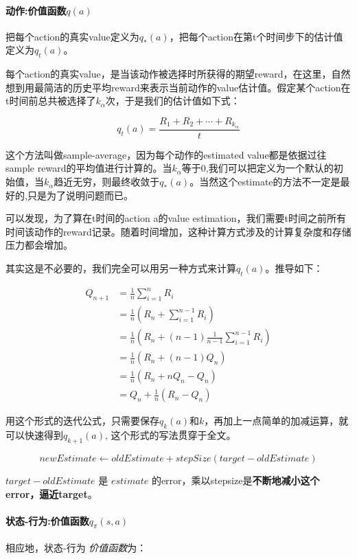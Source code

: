 \documentclass[UTF8,a4paper,12pt]{ctexbook}
\begin{document}
			\paragraph{动作:价值函数$q(a)$}
				把每个action的真实value定义为$q_*(a)$，把每个action在第t个时间步下的估计值定义为$q_t(a)$。
				
				每个action的真实value，是当该动作被选择时所获得的期望reward，在这里，自然想到用最简洁的历史平均reward来表示当前动作的value估计值。假定某个action在t时间前总共被选择了$k_\alpha$次，于是我们的估计值如下式：
			
				$$q_t(a) = \dfrac{R_1 + R_2 + \cdots + R_{k_\alpha}}{t}$$
				
				这个方法叫做sample-average，因为每个动作的estimated value都是依据过往sample reward的平均值进行计算的。当$k_\alpha$等于0,我们可以把定义为一个默认的初始值，当$k_\alpha$趋近无穷，则最终收敛于$q_*(a)$。当然这个estimate的方法不一定是最好的,只是为了说明问题而已。
				
				可以发现，为了算在t时间的action a的value estimation，我们需要t时间之前所有时间该动作的reward记录。随着时间增加，这种计算方式涉及的计算复杂度和存储压力都会增加。
				
				其实这是不必要的，我们完全可以用另一种方式来计算$q_t(a)$。推导如下：
				
				$$\begin{aligned}
				Q_{n+1} &= \frac{1}{n}\sum_{i=1}^{n}R_i \\
				        &= \frac{1}{n}(R_n + \sum_{i=1}^{n-1}R_i) \\
				        &= \frac{1}{n}(R_n + (n-1)\frac{1}{n-1} \sum_{i=1}^{n-1}R_i) \\
				        &= \frac{1}{n}(R_n + (n-1)Q_n) \\
				        &= \frac{1}{n}(R_n + nQ_n-Q_n) \\
				        &= Q_n + \frac{1}{n}(R_n - Q_n)
				\end{aligned}
				$$
				
				用这个形式的迭代公式，只需要保存$q_k(a)$和$k$，再加上一点简单的加减运算，就可以快速得到$q_{k+1}(a)$, 这个形式的写法贯穿于全文。
				
				
				$$ newEstimate \gets oldEstimate + stepSize(target - oldEstimate)$$
				
				$target-oldEstimate$ 是 $estimate$ 的error，乘以stepsize是\textbf{不断地减小这个error，逼近target}。
				
				
			\paragraph{状态-行为:价值函数$q_\pi(s,a)$}
				相应地，状态-行为 \textit{价值函数}为：
				
\end{document}

